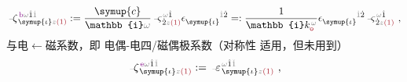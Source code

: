 \begin{align} \label{eq:m<-p}
	\Xint{\begin{smallmatrix} ~ \\ {}^{}_{\mathcolor{gray}{-}} \\ ~ \end{smallmatrix}}{12}{\zeta}^{\;\! \textcolor{Plum}{\text{b}} \mathcolor{gray}{\omega} \hat{1} \mathcolor{gray}{\dot{1}}}_{\;\! \symup{\iota} \mathcolor{gray}{z} \textcolor{Maroon}{(1)}} := \frac{\symup{c}}{\mathbb{i} \mathcolor{gray}{\omega}} \Xint{\begin{smallmatrix} ~ \\ {}^{}_{\mathcolor{gray}{-}} \\ ~ \end{smallmatrix}}{13}{\varsigma}^{\;\! \mathcolor{gray}{\omega} \hat{1}}_{\;\! \dot{2} \mathcolor{gray}{z} \textcolor{Maroon}{(1)}} \epsilon^{\hphantom{\symup{\iota}}\mathcolor{gray}{\dot{1}}\dot{2}}_{\symup{\iota}} =: \frac{1}{\mathbb{i} k_{\textcolor{Maroon}{\mathsf{o}}}^{\;\! \mathcolor{gray}{\omega}}} \epsilon^{\hphantom{\symup{\iota}}\mathcolor{gray}{\dot{1}}\dot{2}}_{\symup{\iota}} \Xint{\begin{smallmatrix} ~ \\ {}^{}_{\mathcolor{gray}{-}} \\ ~ \end{smallmatrix}}{13}{\varsigma}^{\;\! \mathcolor{gray}{\omega} \hat{1}}_{\;\! \dot{2} \mathcolor{gray}{z} \textcolor{Maroon}{(1)}} ~,
\end{align}
与\textcolor{NavyBlue}{电$\longleftarrow$磁}系数，即 \textcolor{NavyBlue}{电偶-电四/磁偶}极系数（对称性  适用，但未用到）
\abovedisplayskip=3pt
\belowdisplayskip=5pt
\begin{align} \label{eq:p<-q/m}
	\Xint{\begin{smallmatrix} ~ \\ {}^{}_{\mathcolor{gray}{-}} \\ ~ \end{smallmatrix}}{12}{\zeta}^{\;\! \textcolor{Plum}{\text{e}} \mathcolor{gray}{\omega} \hat{1} \mathcolor{gray}{\check{1}}}_{\;\! \symup{\iota} \mathcolor{gray}{z} \textcolor{Maroon}{(1)}} := \Xint{\begin{smallmatrix} ~ \\ {}^{}_{\mathcolor{gray}{-}} \\ ~ \end{smallmatrix}}{16}{\varepsilon}^{\;\! \mathcolor{gray}{\omega} \hat{1} \mathcolor{gray}{\check{1}}}_{\;\! \symup{\iota} \mathcolor{gray}{z} \textcolor{Maroon}{(1)}} ~,
\end{align}
